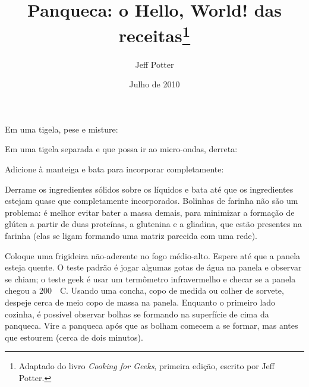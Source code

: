 \documentclass[a4paper,oneside]{article}
\title{Panqueca: o Hello, World! das receitas\footnote{Adaptado do livro
\emph{Cooking for Geeks}, primeira edição, escrito por Jeff Potter.}}
\author{Jeff Potter}
\date{Julho de 2010}
\begin{document}
\frenchspacing

\maketitle

Em uma tigela, pese e misture:


Em uma tigela separada e que possa ir ao micro-ondas, derreta:


Adicione à manteiga e bata para incorporar completamente:


Derrame os ingredientes sólidos sobre os líquidos e bata até que os
ingredientes estejam quase que completamente incorporados. Bolinhas de farinha
não são um problema: é melhor evitar bater a massa demais, para minimizar a
formação de glúten a partir de duas proteínas, a glutenina e a gliadina, que
estão presentes na farinha (elas se ligam formando uma matriz parecida com uma
rede).

Coloque uma frigideira não-aderente no fogo médio-alto. Espere até que a panela
esteja quente. O teste padrão é jogar algumas gotas de água na panela e
observar se chiam; o teste geek é usar um termômetro infravermelho e checar se
a panela chegou a 200~\textdegree~C. Usando uma concha, copo de medida ou
colher de sorvete, despeje cerca de meio copo de massa na panela. Enquanto o
primeiro lado cozinha, é possível observar bolhas se formando na superfície de
cima da panqueca. Vire a panqueca após que as bolham comecem a se formar, mas
antes que estourem (cerca de dois minutos).
\end{document}
